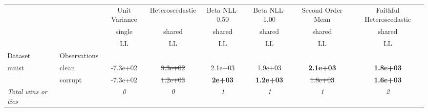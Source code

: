 \begin{tabular}{ll|c|c|c|c|c|c}
\toprule
{} & {} & {Unit Variance} & {Heteroscedastic} & {Beta NLL-0.50} & {Beta NLL-1.00} & {Second Order Mean} & {Faithful Heteroscedastic} \\
{} & {} & {single} & {shared} & {shared} & {shared} & {shared} & {shared} \\
{} & {} & {LL} & {LL} & {LL} & {LL} & {LL} & {LL} \\
{Dataset} & {Observations} & {} & {} & {} & {} & {} & {} \\
\midrule
\multirow[t]{2}{*}{mnist} & clean & -7.3e+02 & \sout{9.3e+02} & 2.1e+03 & 1.9e+03 & \textbf{2.1e+03} & \textbf{1.8e+03} \\
 & corrupt & -7.3e+02 & \sout{1.2e+03} & \textbf{2e+03} & \textbf{1.2e+03} & \sout{1.8e+03} & \textbf{1.6e+03} \\
\textit{{Total wins or ties}} &  & \textit{0} & \textit{0} & \textit{1} & \textit{1} & \textit{1} & \textit{2} \\
\bottomrule
\end{tabular}
